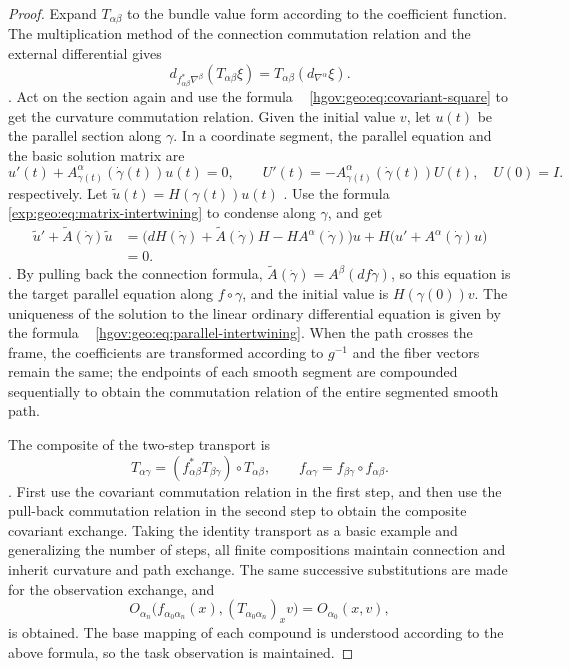 \documentclass[12pt,a4paper,openany,notitlepage]{report}
\theoremstyle{plain}
\theoremstyle{definition}
\theoremstyle{remark}
\def\mathcal#1{#1}\def\mathsf#1{#1}\def\mathbb#1{#1}%
\begin{document}
\begin{CJK*}
\begin{proof}
Expand $T_{\alpha\beta}$ to the bundle value form according to the coefficient function. The multiplication method of the connection commutation relation and the external differential gives \[
d_{f_{\alpha\beta}^*\nabla^\beta}(T_{\alpha\beta}\xi)
=T_{\alpha\beta}(d_{\nabla^\alpha}\xi).
\]. Act on the section again and use the formula ~ \eqref{hgov:geo:eq:covariant-square} to get the curvature commutation relation. Given the initial value $v$, let $u(t)$ be the parallel section along $\gamma$. In a coordinate segment, the parallel equation and the basic solution matrix are \[
u'(t)+A^\alpha_{\gamma(t)}(\dot\gamma(t))u(t)=0,
\qquad
U'(t)=-A^\alpha_{\gamma(t)}(\dot\gamma(t))U(t),\quad U(0)=I.
\] respectively. Let $\widetilde u(t)=H(\gamma(t))u(t)$ . Use the formula ~ \eqref{exp:geo:eq:matrix-intertwining} to condense along $\gamma$, and get \[
\begin{aligned}
\widetilde u'+\widetilde A(\dot\gamma)\widetilde u
&=\bigl(dH(\dot\gamma)+\widetilde A(\dot\gamma)H
       -HA^\alpha(\dot\gamma)\bigr)u
 +H\bigl(u'+A^\alpha(\dot\gamma)u\bigr)\\
&=0.
\end{aligned}
\]. By pulling back the connection formula, $\widetilde A(\dot\gamma)=A^\beta(df\dot\gamma)$, so this equation is the target parallel equation along $f\circ\gamma$, and the initial value is $H(\gamma(0))v$. The uniqueness of the solution to the linear ordinary differential equation is given by the formula ~ \eqref{hgov:geo:eq:parallel-intertwining}. When the path crosses the frame, the coefficients are transformed according to $g^{-1}$ and the fiber vectors remain the same; the endpoints of each smooth segment are compounded sequentially to obtain the commutation relation of the entire segmented smooth path.

The composite of the two-step transport is \[
T_{\alpha\gamma}
=(f_{\alpha\beta}^*T_{\beta\gamma})\circ T_{\alpha\beta},
\qquad
f_{\alpha\gamma}=f_{\beta\gamma}\circ f_{\alpha\beta}.
\]. First use the covariant commutation relation in the first step, and then use the pull-back commutation relation in the second step to obtain the composite covariant exchange. Taking the identity transport as a basic example and generalizing the number of steps, all finite compositions maintain connection and inherit curvature and path exchange. The same successive substitutions are made for the observation exchange, and \[
\mathcal O_{\alpha_n}\bigl(f_{\alpha_0\alpha_n}(x),
(T_{\alpha_0\alpha_n})_xv\bigr)
=\mathcal O_{\alpha_0}(x,v),
\] is obtained. The base mapping of each compound is understood according to the above formula, so the task observation is maintained.\end{proof}



\end{CJK*}
\end{document}
